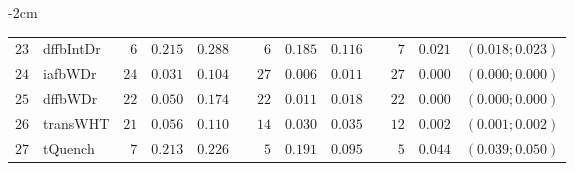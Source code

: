 \begin{table*}[!htbp]
\begin{adjustwidth*}{}{-2cm}
\begin{tabular}{@{}rlrrrrrrrrrcc@{}}
\footnotesize{$23$} & \footnotesize{dffbIntDr} & \footnotesize{$6 $} & \footnotesize{$0.215$} & \footnotesize{$0.288$} && \footnotesize{$6 $} & \footnotesize{$0.185$} & \footnotesize{$0.116$} && \footnotesize{$7 $} & \footnotesize{$0.021$} & \footnotesize{$(0.018;0.023)$} \\
\footnotesize{$24$} & \footnotesize{iafbWDr  } & \footnotesize{$24$} & \footnotesize{$0.031$} & \footnotesize{$0.104$} && \footnotesize{$27$} & \footnotesize{$0.006$} & \footnotesize{$0.011$} && \footnotesize{$27$} & \footnotesize{$0.000$} & \footnotesize{$(0.000;0.000)$} \\
\footnotesize{$25$} & \footnotesize{dffbWDr  } & \footnotesize{$22$} & \footnotesize{$0.050$} & \footnotesize{$0.174$} && \footnotesize{$22$} & \footnotesize{$0.011$} & \footnotesize{$0.018$} && \footnotesize{$22$} & \footnotesize{$0.000$} & \footnotesize{$(0.000;0.000)$} \\
\footnotesize{$26$} & \footnotesize{transWHT } & \footnotesize{$21$} & \footnotesize{$0.056$} & \footnotesize{$0.110$} && \footnotesize{$14$} & \footnotesize{$0.030$} & \footnotesize{$0.035$} && \footnotesize{$12$} & \footnotesize{$0.002$} & \footnotesize{$(0.001;0.002)$} \\
\footnotesize{$27$} & \footnotesize{tQuench  } & \footnotesize{$7 $} & \footnotesize{$0.213$} & \footnotesize{$0.226$} && \footnotesize{$5 $} & \footnotesize{$0.191$} & \footnotesize{$0.095$} && \footnotesize{$5 $} & \footnotesize{$0.044$} & \footnotesize{$(0.039;0.050)$} \\
\bottomrule
\end{tabular}
\end{adjustwidth*}
\end{table*}

